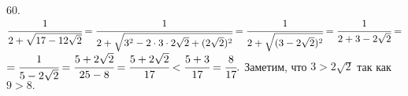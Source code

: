 60. $\cfrac{1}{2+\sqrt{17-12\sqrt{2}}}=\cfrac{1}{2+\sqrt{3^2-2\cdot3\cdot2\sqrt{2}+(2\sqrt{2})^2}}=
\cfrac{1}{2+\sqrt{(3-2\sqrt{2})^2}}=\cfrac{1}{2+3-2\sqrt{2}}=$\\$=\cfrac{1}{5-2\sqrt{2}}=
\cfrac{5+2\sqrt{2}}{25-8}=\cfrac{5+2\sqrt{2}}{17}<\cfrac{5+3}{17}=\cfrac{8}{17}.$ Заметим, что $3>2\sqrt{2}$ так как $9>8.$\\
